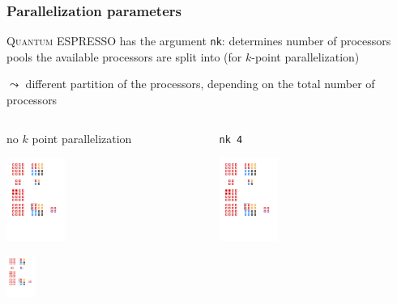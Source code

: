 \documentclass[aspectratio=169]{beamer}
\newcommand{\QE}{\textsc{Quantum} ESPRESSO\xspace}
\begin{document}
\begin{frame}
	\frametitle{Parallelization parameters}

	\QE has the argument \texttt{nk}: determines number of processors pools the available processors are split into (for \(k\)-point parallelization)

	\(\leadsto\) different partition of the processors, depending on the total number of processors

	\begin{columns}
		\begin{column}{0.5\textwidth}
			\pause[2]\begin{center}
				no \(k\) point parallelization

				\includegraphics[width=0.3\textwidth]{figs/np16_no_kpoint.pdf}
			\end{center}

			\pause[3]\begin{center}
			\includegraphics[width=0.15\textwidth]{figs/np4_no_kpoint.pdf}			
			\end{center}
		\end{column}

		\begin{column}{0.5\textwidth}
			\pause[2]\begin{center}
				\texttt{nk 4}

				\centering
				\includegraphics[width=0.3\textwidth]{figs/np16_nk_4.pdf}			
			\end{center}


\end{column}
\end{columns}
\end{frame}
\end{document}
